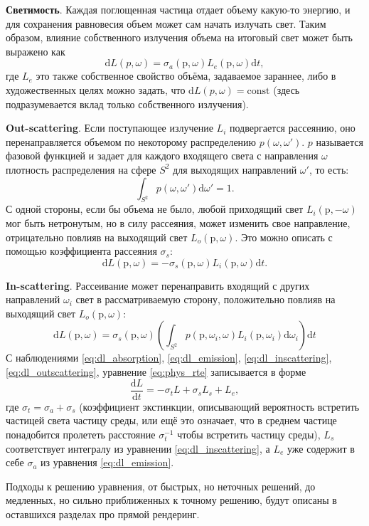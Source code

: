 \textbf{Светимость}. Каждая поглощенная частица отдает объему какую-то энергию, и для сохранения равновесия объем может сам начать излучать свет. Таким образом, влияние собственного излучения объема на итоговый свет может быть выражено как
%
\begin{equation}
	\label{eq:dl_emission}
	\mathrm dL(p, \omega) = \sigma_a(\mathrm p, \omega) L_e(\mathrm p, \omega) \mathrm dt,
\end{equation}
%
где $L_e$ это также собственное свойство объёма, задаваемое зараннее, либо в художественных целях можно задать, что $\mathrm dL(p, \omega) = \mathrm{const}$ (здесь подразумевается вклад только собственного излучения).

\textbf{Out-scattering}. Если поступающее излучение $L_i$ подвергается рассеянию, оно перенаправляется объемом по некоторому распределению $p(\omega, \omega')$. $p$ называется фазовой функцией и задает для каждого входящего света с направления $\omega$ плотность распределения на сфере $S^2$ для выходящих направлений $\omega'$, то есть:
\[
	\int_{S^2} p(\omega, \omega') \mathrm d\omega' = 1.
\]
С одной стороны, если бы объема не было, любой приходящий свет $L_i(\mathrm p, -\omega)$ мог быть нетронутым, но в силу рассеяния, может изменить свое направление, отрицательно повлияв на выходящий свет $L_o(\mathrm p, \omega)$. Это можно описать с помощью коэффициента рассеяния $\sigma_s$:
%
\begin{equation}
	\label{eq:dl_outscattering}
	\mathrm dL(\mathrm p, \omega) = -\sigma_s(\mathrm p, \omega) L_i(\mathrm p, \omega) \mathrm dt.
\end{equation}

\textbf{In-scattering}. Рассеивание может перенаправить входящий с других направлений $\omega_i$ свет в рассматриваемую сторону, положительно повлияв на выходящий свет $L_o(\mathrm p, \omega)$:
%
\begin{equation}
	\label{eq:dl_inscattering}
	\mathrm dL(\mathrm p, \omega) = \sigma_s(\mathrm p, \omega) \left( \int_{S^2} p(\mathrm p, \omega_i, \omega) L_i(\mathrm p, \omega_i) \mathrm d\omega_i \right) \mathrm dt
\end{equation}
%
С наблюдениями \ref{eq:dl_absorption}, \ref{eq:dl_emission}, \ref{eq:dl_inscattering}, \ref{eq:dl_outscattering}, уравнение \ref{eq:phys_rte} записывается в форме
%
\begin{equation}
	\label{eq:graphics_rte}
	\frac{\mathrm dL}{\mathrm dt} = -\sigma_t L + \sigma_s L_s + L_e,
\end{equation}
%
где $\sigma_t = \sigma_a + \sigma_s$ (коэффициент экстинкции, описывающий вероятность встретить частицей света частицу среды, или ещё это означает, что в среднем частице понадобится пролететь расстояние $\sigma_t^{-1}$ чтобы встретить частицу среды), $L_s$ соответствует интегралу из уравнении \ref{eq:dl_inscattering}, а $L_e$ уже содержит в себе $\sigma_a$ из уравнения \ref{eq:dl_emission}.

Подходы к решению уравнения, от быстрых, но неточных решений, до медленных, но сильно приближенных к точному решению, будут описаны в оставшихся разделах про прямой рендеринг.